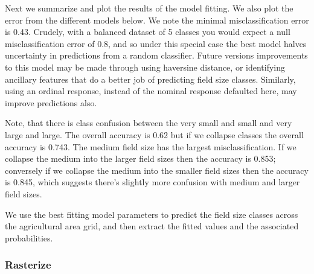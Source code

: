 \documentclass{article}
\begin{document}
Next we summarize and plot the results of the model fitting. We also plot the error from the
different models below. We note the minimal misclassification error is 0.43. Crudely, with a balanced dataset of 5 classes you would expect a null misclassification error of 0.8, and so under this special case the best model halves uncertainty in predictions from a random classifier. Future versions improvements to this model may be made through using haversine distance, or identifying ancillary features that do a better job of predicting field size classes. Similarly, using an ordinal response, instead of the nominal response defaulted here, may improve predictions also.

Note, that there is class confusion between the very small and small and very large and large. The overall accuracy is 0.62 but if we collapse classes the overall accuracy is 0.743. The medium field size has the largest misclassification. If we collapse the medium into the larger field sizes then the accuracy is 0.853; conversely if we collapse the medium into the smaller field sizes then the accuracy is 0.845, which suggests there's slightly more confusion with medium and larger field sizes.



We use the best fitting model parameters to predict the field size classes across the agricultural area grid, and then extract the fitted values and the associated probabilities.
\begin{Schunk}
\end{Schunk}

\subsubsection{Rasterize}
\end{document}
